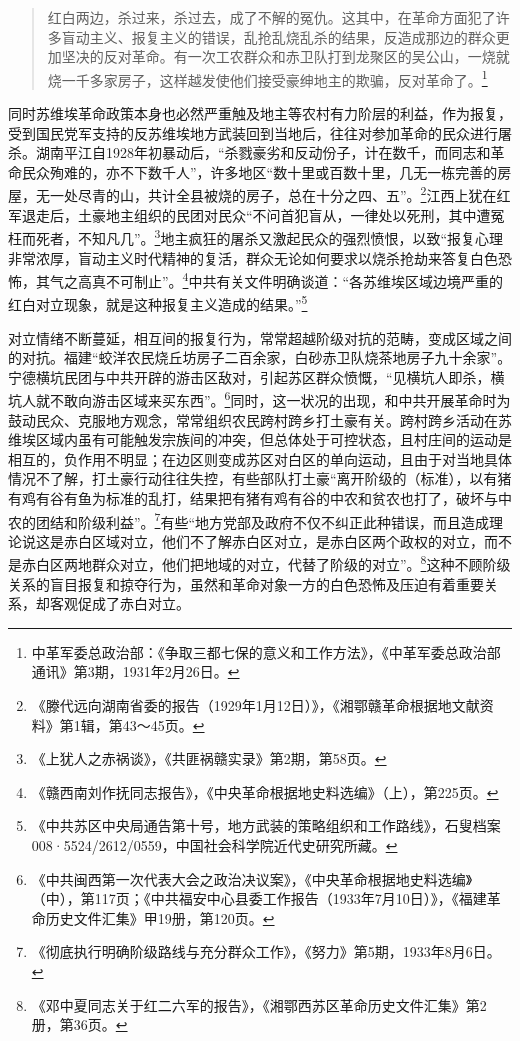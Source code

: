 \begin{quote}

红白两边，杀过来，杀过去，成了不解的冤仇。这其中，在革命方面犯了许多盲动主义、报复主义的错误，乱抢乱烧乱杀的结果，反造成那边的群众更加坚决的反对革命。有一次工农群众和赤卫队打到龙聚区的吴公山，一烧就烧一千多家房子，这样越发使他们接受豪绅地主的欺骗，反对革命了。\footnote{中革军委总政治部：《争取三都七保的意义和工作方法》，《中革军委总政治部通讯》第3期，1931年2月26日。}
\end{quote}


同时苏维埃革命政策本身也必然严重触及地主等农村有力阶层的利益，作为报复，受到国民党军支持的反苏维埃地方武装回到当地后，往往对参加革命的民众进行屠杀。湖南平江自1928年初暴动后，“杀戮豪劣和反动份子，计在数千，而同志和革命民众殉难的，亦不下数千人”，许多地区“数十里或百数十里，几无一栋完善的房屋，无一处尽青的山，共计全县被烧的房子，总在十分之四、五”。\footnote{《滕代远向湖南省委的报告（1929年1月12日）》，《湘鄂赣革命根据地文献资料》第1辑，第43～45页。}江西上犹在红军退走后，土豪地主组织的民团对民众“不问首犯盲从，一律处以死刑，其中遭冤枉而死者，不知凡几”。\footnote{《上犹人之赤祸谈》，《共匪祸赣实录》第2期，第58页。}地主疯狂的屠杀又激起民众的强烈愤恨，以致“报复心理非常浓厚，盲动主义时代精神的复活，群众无论如何要求以烧杀抢劫来答复白色恐怖，其气之高真不可制止”。\footnote{《赣西南刘作抚同志报告》，《中央革命根据地史料选编》（上），第225页。}中共有关文件明确谈道：“各苏维埃区域边境严重的红白对立现象，就是这种报复主义造成的结果。”\footnote{《中共苏区中央局通告第十号，地方武装的策略组织和工作路线》，石叟档案008·5524/2612/0559，中国社会科学院近代史研究所藏。}


对立情绪不断蔓延，相互间的报复行为，常常超越阶级对抗的范畴，变成区域之间的对抗。福建“蛟洋农民烧丘坊房子二百余家，白砂赤卫队烧茶地房子九十余家”。宁德横坑民团与中共开辟的游击区敌对，引起苏区群众愤慨，“见横坑人即杀，横坑人就不敢向游击区域来买东西”。\footnote{《中共闽西第一次代表大会之政治决议案》，《中央革命根据地史料选编》（中），第117页；《中共福安中心县委工作报告（1933年7月10日）》，《福建革命历史文件汇集》甲19册，第120页。}同时，这一状况的出现，和中共开展革命时为鼓动民众、克服地方观念，常常组织农民跨村跨乡打土豪有关。跨村跨乡活动在苏维埃区域内虽有可能触发宗族间的冲突，但总体处于可控状态，且村庄间的运动是相互的，负作用不明显；在边区则变成苏区对白区的单向运动，且由于对当地具体情况不了解，打土豪行动往往失控，有些部队打土豪“离开阶级的（标准），以有猪有鸡有谷有鱼为标准的乱打，结果把有猪有鸡有谷的中农和贫农也打了，破坏与中农的团结和阶级利益”。\footnote{《彻底执行明确阶级路线与充分群众工作》，《努力》第5期，1933年8月6日。}有些“地方党部及政府不仅不纠正此种错误，而且造成理论说这是赤白区域对立，他们不了解赤白区对立，是赤白区两个政权的对立，而不是赤白区两地群众对立，他们把地域的对立，代替了阶级的对立”。\footnote{《邓中夏同志关于红二六军的报告》，《湘鄂西苏区革命历史文件汇集》第2册，第36页。}这种不顾阶级关系的盲目报复和掠夺行为，虽然和革命对象一方的白色恐怖及压迫有着重要关系，却客观促成了赤白对立。


